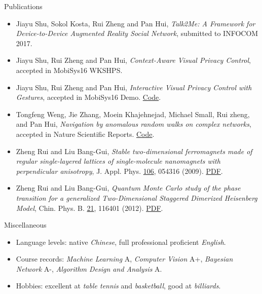 \documentclass{resume} %
\begin{document}
\begin{rSection}{Publications}

\begin{itemize}[label=\raisebox{0.25ex}{\tiny\JackStarBold}]
\item Jiayu Shu, Sokol Kosta, Rui Zheng and Pan Hui, \emph{Talk2Me: A Framework for Device-to-Device Augmented Reality Social Network}, submitted to \textsf{INFOCOM 2017}.

\item Jiayu Shu, Rui Zheng and Pan Hui, \emph{Context-Aware Visual Privacy Control}, accepted in \textsf{MobiSys16 WKSHPS}.

\item Jiayu Shu, Rui Zheng and Pan Hui, \emph{Interactive Visual Privacy Control with Gestures}, accepted in \textsf{MobiSys16 Demo}. \href{https://github.com/ZhengRui/mobisys16demo}{Code}.

\item Tongfeng Weng, Jie Zhang, Moein Khajehnejad, Michael Small, Rui zheng, and Pan Hui, \emph{Navigation by anomalous random walks on complex networks}, accepted in \textsf{Nature Scientific Reports}. \href{https://github.com/ZhengRui/mean-first-passage}{Code}.

\item Zheng Rui and Liu Bang-Gui, \emph{Stable two-dimensional ferromagnets made of regular single-layered lattices of single-molecule nanomagnets with perpendicular anisotropy}, \textsf{J. Appl. Phys.} \underline{106}, 054316 (2009). \href{http://bit.ly/29aBRQD}{PDF}.

\item Zheng Rui and Liu Bang-Gui, \emph{Quantum Monte Carlo study of the phase transition for a generalized Two-Dimensional Staggered Dimerized Heisenberg Model}, \textsf{Chin. Phys. B.} \underline{21}, 116401 (2012). \href{http://bit.ly/29aBDJb}{PDF}.
\end{itemize}

\end{rSection}

\begin{rSection}{Miscellaneous}
\begin{itemize}[label=\raisebox{0.25ex}{\tiny\JackStarBold}]
    \item Language levels: native {\it Chinese}, full professional proficient {\it English}.
    \item Course records: {\it Machine Learning} {\color{DarkOrchid} A}, {\it Computer Vision} {\color{DarkOrchid} A+}, {\it Bayesian Network} {\color{DarkOrchid} A-}, {\it Algorithm Design and Analysis} {\color{DarkOrchid} A}.
    \item Hobbies: excellent at {\it table tennis} and {\it basketball}, good at {\it billiards}.
\end{itemize}
\end{rSection}
\end{document}
